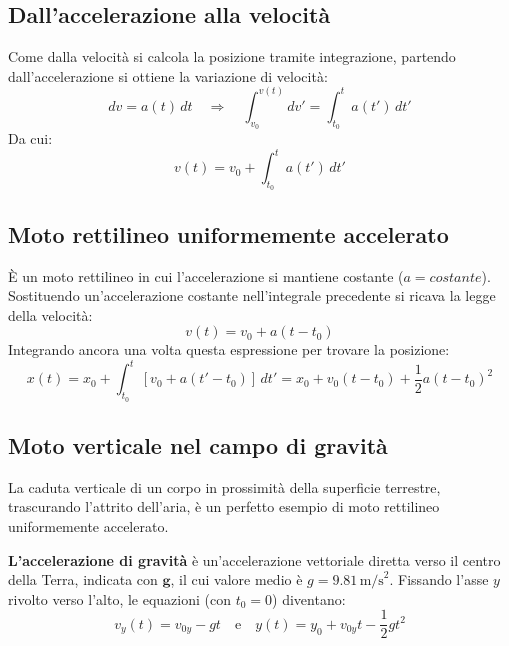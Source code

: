 \documentclass[12pt]{article}
\begin{document}
\subsection*{Dall'accelerazione alla velocità}
Come dalla velocità si calcola la posizione tramite integrazione, partendo dall'accelerazione si ottiene la variazione di velocità: %
\begin{equation}
dv = a(t) \, dt \quad \Rightarrow \quad \int_{v_0}^{v(t)} dv' = \int_{t_0}^{t} a(t') \, dt'
\end{equation}
Da cui:
\begin{equation}
v(t) = v_0 + \int_{t_0}^{t} a(t') \, dt' \tag{1.7}
\end{equation}

\subsection*{Moto rettilineo uniformemente accelerato}
È un moto rettilineo in cui l'accelerazione si mantiene costante ($a = costante$). %
Sostituendo un'accelerazione costante nell'integrale precedente si ricava la legge della velocità:
\begin{equation}
v(t) = v_0 + a(t - t_0)
\end{equation}
Integrando ancora una volta questa espressione per trovare la posizione:
\begin{equation}
x(t) = x_0 + \int_{t_0}^t [v_0 + a(t' - t_0)] \, dt' = x_0 + v_0(t - t_0) + \frac{1}{2}a(t - t_0)^2 \tag{1.8 e 1.10}
\end{equation}

\subsection*{Moto verticale nel campo di gravità}
La caduta verticale di un corpo in prossimità della superficie terrestre, trascurando l'attrito dell'aria, è un perfetto esempio di moto rettilineo uniformemente accelerato. %

\textbf{L'accelerazione di gravità} è un'accelerazione vettoriale diretta verso il centro della Terra, indicata con $\mathbf{g}$, il cui valore medio è $g = 9.81 \, \text{m/s}^2$. Fissando l'asse $y$ rivolto verso l'alto, le equazioni (con $t_0=0$) diventano:
\begin{equation}
v_y(t) = v_{0y} - gt \quad \text{e} \quad y(t) = y_0 + v_{0y}t - \frac{1}{2}gt^2
\end{equation}
\end{document}
